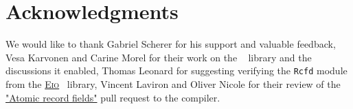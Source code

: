 \section*{Acknowledgments}

We would like to thank Gabriel Scherer for his support and valuable feedback, Vesa Karvonen and Carine Morel for their work on the \Saturn~\cite{saturn} library and the discussions it enabled, Thomas Leonard for suggesting verifying the \texttt{Rcfd} module from the \href{https://github.com/ocaml-multicore/eio}{\textsc{Eio}}~\cite{eio} library, Vincent Laviron and Oliver Nicole for their review of the \href{https://github.com/ocaml/ocaml/pull/13404}{"Atomic record fields"} pull request to the \OCaml compiler.